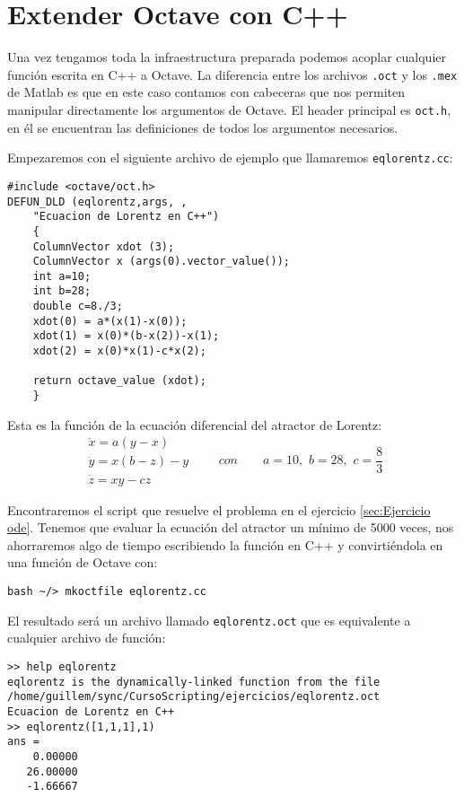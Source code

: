 \section{Extender Octave con C++}

Una vez tengamos toda la infraestructura preparada podemos acoplar
cualquier función escrita en C++ a Octave. La diferencia entre los
archivos \texttt{.oct} y los \texttt{.mex} de Matlab es que en este
caso contamos con cabeceras que nos permiten manipular directamente
los argumentos de Octave. El header principal es \texttt{oct.h}, en él
se encuentran las definiciones de todos los argumentos necesarios.

Empezaremos con el siguiente archivo de ejemplo que llamaremos
\texttt{eqlorentz.cc}:

\begin{verbatim}
#include <octave/oct.h>
DEFUN_DLD (eqlorentz,args, ,
    "Ecuacion de Lorentz en C++")
    {
    ColumnVector xdot (3);
    ColumnVector x (args(0).vector_value());
    int a=10;
    int b=28;
    double c=8./3;
    xdot(0) = a*(x(1)-x(0));
    xdot(1) = x(0)*(b-x(2))-x(1);
    xdot(2) = x(0)*x(1)-c*x(2);
    
    return octave_value (xdot);
    }
\end{verbatim}
Esta es la función de la ecuación diferencial del atractor de Lorentz:
$$
\begin{array}{l}
  \dot{x}=a(y-x)\\
  \dot{y}=x(b-z)-y\\
  \dot{z}=xy-cz\end{array}\qquad con\qquad 
a=10,\,\, b=28,\,\, c=\frac{8}{3}$$

Encontraremos el script que resuelve el problema en el ejercicio
\ref{sec:Ejercicio ode}.  Tenemos que evaluar la ecuación del atractor
un mínimo de 5000 veces, nos ahorraremos algo de tiempo escribiendo la
función en C++ y convirtiéndola en una función de Octave con:

\begin{verbatim}
bash ~/> mkoctfile eqlorentz.cc
\end{verbatim}

El resultado será un archivo llamado \texttt{eqlorentz.oct} que es
equivalente a cualquier archivo de función:

\begin{verbatim}
>> help eqlorentz
eqlorentz is the dynamically-linked function from the file
/home/guillem/sync/CursoScripting/ejercicios/eqlorentz.oct
Ecuacion de Lorentz en C++
>> eqlorentz([1,1,1],1)
ans =
    0.00000
   26.00000
   -1.66667
\end{verbatim}

